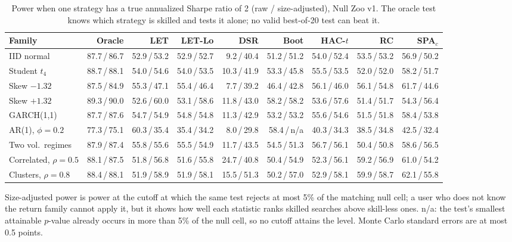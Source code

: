 \begin{table}[t]
\centering
\footnotesize
\setlength{\tabcolsep}{3.5pt}
\caption{Power when one strategy has a true annualized Sharpe ratio of 2 (raw / size-adjusted), Null Zoo v1. The oracle test knows which strategy is skilled and tests it alone; no valid best-of-20 test can beat it.}
\label{tab:power}
\begin{tabular}{lrrrrrrrr}
\toprule
Family & Oracle & LET & LET-Lo & DSR & Boot & HAC-$t$ & RC & SPA$_c$ \\
\midrule
IID normal & 87.7\,/\,86.7 & 52.9\,/\,53.2 & 52.9\,/\,52.7 & 9.2\,/\,40.4 & 51.2\,/\,51.2 & 54.0\,/\,52.4 & 53.5\,/\,53.2 & 56.9\,/\,50.2 \\
Student $t_4$ & 88.7\,/\,88.1 & 54.0\,/\,54.6 & 54.0\,/\,53.5 & 10.3\,/\,41.9 & 53.3\,/\,45.8 & 55.5\,/\,53.5 & 52.0\,/\,52.0 & 58.2\,/\,51.7 \\
Skew $-1.32$ & 87.5\,/\,84.9 & 55.3\,/\,47.1 & 55.4\,/\,46.4 & 7.7\,/\,39.2 & 46.4\,/\,42.8 & 56.1\,/\,46.0 & 56.1\,/\,54.8 & 61.7\,/\,44.6 \\
Skew $+1.32$ & 89.3\,/\,90.0 & 52.6\,/\,60.0 & 53.1\,/\,58.6 & 11.8\,/\,43.0 & 58.2\,/\,58.2 & 53.6\,/\,57.6 & 51.4\,/\,51.7 & 54.3\,/\,56.4 \\
GARCH(1,1) & 87.7\,/\,87.6 & 54.7\,/\,54.9 & 54.8\,/\,54.8 & 11.3\,/\,42.9 & 53.2\,/\,53.2 & 55.6\,/\,54.6 & 51.5\,/\,51.8 & 58.4\,/\,53.8 \\
AR(1), $\phi=0.2$ & 77.3\,/\,75.1 & 60.3\,/\,35.4 & 35.4\,/\,34.2 & 8.0\,/\,29.8 & 58.4\,/\,n/a & 40.3\,/\,34.3 & 38.5\,/\,34.8 & 42.5\,/\,32.4 \\
Two vol.\ regimes & 87.9\,/\,87.4 & 55.8\,/\,55.6 & 55.5\,/\,54.9 & 11.7\,/\,43.5 & 54.5\,/\,51.3 & 56.7\,/\,56.1 & 50.4\,/\,50.8 & 58.6\,/\,56.5 \\
Correlated, $\rho=0.5$ & 88.1\,/\,87.5 & 51.8\,/\,56.8 & 51.6\,/\,55.8 & 24.7\,/\,40.8 & 50.4\,/\,54.9 & 52.3\,/\,56.1 & 59.2\,/\,56.9 & 61.0\,/\,54.2 \\
Clusters, $\rho=0.8$ & 88.4\,/\,88.1 & 51.9\,/\,58.9 & 51.9\,/\,58.1 & 15.5\,/\,51.3 & 50.2\,/\,57.0 & 52.9\,/\,58.1 & 59.9\,/\,58.7 & 62.1\,/\,55.8 \\
\bottomrule
\end{tabular}
\par\smallskip\begin{minipage}{0.97\linewidth}\footnotesize Size-adjusted power is power at the cutoff at which the same test rejects at most 5\% of the matching null cell; a user who does not know the return family cannot apply it, but it shows how well each statistic ranks skilled searches above skill-less ones. n/a: the test's smallest attainable $p$-value already occurs in more than 5\% of the null cell, so no cutoff attains the level. Monte Carlo standard errors are at most 0.5 points.\end{minipage}
\end{table}

